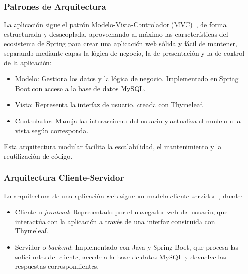 \subsubsection{Patrones de Arquitectura}
La aplicación sigue el patrón Modelo-Vista-Controlador (MVC)~\cite{modelo-vista-controrlador}, de forma estructurada y desacoplada, aprovechando al máximo las características del ecosistema de Spring para crear una aplicación web sólida y fácil de mantener, separando mediante capas la lógica de negocio, la de presentación y la de control de la aplicación:
\begin{itemize}
\tightlist
\item
Modelo: Gestiona los datos y la lógica de negocio. Implementado en Spring Boot con acceso a la base de datos MySQL.
\item
Vista: Representa la interfaz de usuario, creada con Thymeleaf.
\item
Controlador: Maneja las interacciones del usuario y actualiza el modelo o la vista según corresponda.
\end{itemize}
Esta arquitectura modular facilita la escalabilidad, el mantenimiento y la reutilización de código.

\subsubsection{Arquitectura Cliente-Servidor}
La arquitectura de una aplicación web sigue un modelo cliente-servidor~\cite{client-server-model}, donde:
\begin{itemize}
\tightlist
\item
Cliente o \emph{frontend}: Representado por el navegador web del usuario, que interactúa con la aplicación a través de una interfaz construida con Thymeleaf.
\item
Servidor o \emph{backend}: Implementado con Java y Spring Boot, que procesa las solicitudes del cliente, accede a la base de datos MySQL y devuelve las respuestas correspondientes.
\end{itemize}
